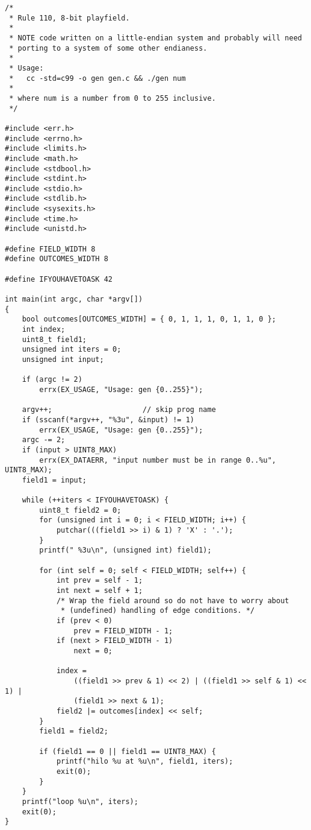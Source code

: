 \documentclass[a4paper,10pt,twoside,onecolumn,openany,final]{memoir}
\begin{document}
\begin{verbatim}
/*
 * Rule 110, 8-bit playfield.
 *
 * NOTE code written on a little-endian system and probably will need
 * porting to a system of some other endianess.
 *
 * Usage:
 *   cc -std=c99 -o gen gen.c && ./gen num
 *
 * where num is a number from 0 to 255 inclusive.
 */

#include <err.h>
#include <errno.h>
#include <limits.h>
#include <math.h>
#include <stdbool.h>
#include <stdint.h>
#include <stdio.h>
#include <stdlib.h>
#include <sysexits.h>
#include <time.h>
#include <unistd.h>

#define FIELD_WIDTH 8
#define OUTCOMES_WIDTH 8

#define IFYOUHAVETOASK 42

int main(int argc, char *argv[])
{
    bool outcomes[OUTCOMES_WIDTH] = { 0, 1, 1, 1, 0, 1, 1, 0 };
    int index;
    uint8_t field1;
    unsigned int iters = 0;
    unsigned int input;

    if (argc != 2)
        errx(EX_USAGE, "Usage: gen {0..255}");

    argv++;                     // skip prog name
    if (sscanf(*argv++, "%3u", &input) != 1)
        errx(EX_USAGE, "Usage: gen {0..255}");
    argc -= 2;
    if (input > UINT8_MAX)
        errx(EX_DATAERR, "input number must be in range 0..%u", UINT8_MAX);
    field1 = input;

    while (++iters < IFYOUHAVETOASK) {
        uint8_t field2 = 0;
        for (unsigned int i = 0; i < FIELD_WIDTH; i++) {
            putchar(((field1 >> i) & 1) ? 'X' : '.');
        }
        printf(" %3u\n", (unsigned int) field1);

        for (int self = 0; self < FIELD_WIDTH; self++) {
            int prev = self - 1;
            int next = self + 1;
            /* Wrap the field around so do not have to worry about
             * (undefined) handling of edge conditions. */
            if (prev < 0)
                prev = FIELD_WIDTH - 1;
            if (next > FIELD_WIDTH - 1)
                next = 0;

            index =
                ((field1 >> prev & 1) << 2) | ((field1 >> self & 1) << 1) |
                (field1 >> next & 1);
            field2 |= outcomes[index] << self;
        }
        field1 = field2;

        if (field1 == 0 || field1 == UINT8_MAX) {
            printf("hilo %u at %u\n", field1, iters);
            exit(0);
        }
    }
    printf("loop %u\n", iters);
    exit(0);
}
\end{verbatim}
\end{document}
